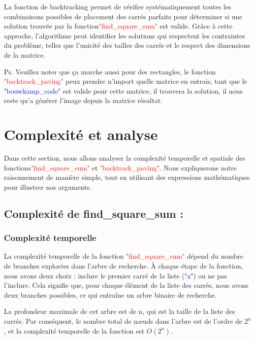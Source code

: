 \documentclass{article}
\begin{document}
La fonction de backtracking permet de vérifier systématiquement toutes les combinaisons possibles de placement des carrés parfaits pour déterminer si une solution trouvée par la fonction\textcolor{red}{"find\_square\_sum"}  est valide. Grâce à cette approche, l'algorithme peut identifier les solutions qui respectent les contraintes du problème, telles que l'unicité des tailles des carrés et le respect des dimensions de la matrice.\newline

Ps. Veuillez noter que ça marche aussi pour des rectangles, le fonction \textcolor{red}{"backtrack\_paving"} peux prendre n'import quelle matrice en entrais, tant que le \textcolor{blue}{"bouwkamp\_code"} est valide pour cette matrice, il trouvera la solution, il nous reste qu'a générer l'image depuis la matrice résultat.

\section{Complexité et analyse}

Dans cette section, nous allons analyser la complexité temporelle et spatiale des fonctions\newline \textcolor{red}{"find\_square\_sum"} et \textcolor{red}{"backtrack\_paving"}. Nous expliquerons notre raisonnement de manière simple, tout en utilisant des expressions mathématiques pour illustrer nos arguments.

\subsection{ Complexité de find\_square\_sum :}
\subsubsection{Complexité temporelle}
La complexité temporelle de la fonction \textcolor{red}{"find\_square\_sum"} dépend du nombre de branches explorées dans l'arbre de recherche. À chaque étape de la fonction, nous avons deux choix : inclure le premier carré de la liste (\textcolor{blue}{"x"}) ou ne pas l'inclure. Cela signifie que, pour chaque élément de la liste des carrés, nous avons deux branches possibles, ce qui entraîne un arbre binaire de recherche.\newline

La profondeur maximale de cet arbre est de n, qui est la taille de la liste des carrés. Par conséquent, le nombre total de nœuds dans l'arbre est de l'ordre de $2^n$, et la complexité temporelle de la fonction est $O(2^n)$.\newline
\end{document}
